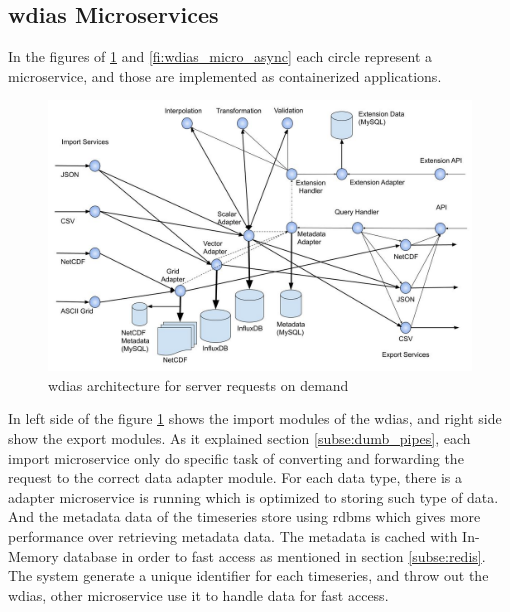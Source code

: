 \subsection{\acrshort{wdias} Microservices}
\label{sebse:wdias_microservices}
In the figures of \ref{fi:wdias_micro_on_demand} and \ref{fi:wdias_micro_async} each circle represent a microservice, and those are implemented as containerized applications.
\begin{figure}[htp]
    \centering
    \includegraphics[width=1\textwidth]{method/microservice/microservice_architecture-handle_on_demand-v3.jpg}
    \caption{\acrshort{wdias} architecture for server requests on demand}
    \label{fi:wdias_micro_on_demand}
\end{figure}
In left side of the figure \ref{fi:wdias_micro_on_demand} shows the import modules of the \acrshort{wdias}, and right side show the export modules. As it explained section \ref{subse:dumb_pipes}, each import microservice only do specific task of converting and forwarding the request to the correct data adapter module.
For each data type, there is a adapter microservice is running which is optimized to storing such type of data. And the metadata data of the timeseries store using \acrshort{rdbms} which gives more performance over retrieving metadata data. The metadata is cached with In-Memory database in order to fast access as mentioned in section \ref{subse:redis}.
The system generate a unique identifier for each timeseries, and throw out the \acrshort{wdias}, other microservice use it to handle data for fast access.

